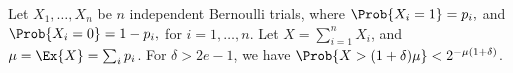 \begin{lemma}
        Let $X_1, \ldots, X_n$ be $n$ independent Bernoulli trials,
        where
        \begin{math}
            \Prob{ X_i = 1 } =p_i,
        \end{math}
        and
        \begin{math}
            \Prob{ X_i = 0 } =1- p_i,
        \end{math}
        for $i=1,\ldots, n$.  Let $X = \sum_{i=1}^{n} X_i$, and
        $\mu = \Ex{\bigl. X} = \sum_i p_i$.  For $\delta > 2e-1$, we have
        $\Prob{ \bigl. X > (1+\delta)\mu } < 2^{-\mu (1 + \delta)}$.
    \end{lemma}
